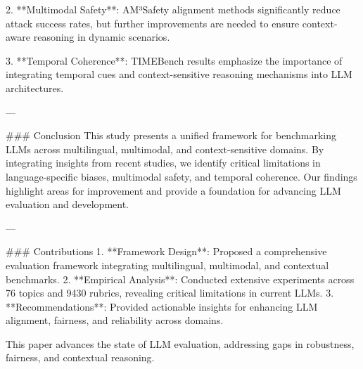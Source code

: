 2. **Multimodal Safety**: AM³Safety alignment methods significantly reduce attack success rates, but further improvements are needed to ensure context-aware reasoning in dynamic scenarios.  

3. **Temporal Coherence**: TIMEBench results emphasize the importance of integrating temporal cues and context-sensitive reasoning mechanisms into LLM architectures.  

---

### Conclusion  
This study presents a unified framework for benchmarking LLMs across multilingual, multimodal, and context-sensitive domains. By integrating insights from recent studies, we identify critical limitations in language-specific biases, multimodal safety, and temporal coherence. Our findings highlight areas for improvement and provide a foundation for advancing LLM evaluation and development.

---

### Contributions  
1. **Framework Design**: Proposed a comprehensive evaluation framework integrating multilingual, multimodal, and contextual benchmarks.  
2. **Empirical Analysis**: Conducted extensive experiments across 76 topics and 9430 rubrics, revealing critical limitations in current LLMs.  
3. **Recommendations**: Provided actionable insights for enhancing LLM alignment, fairness, and reliability across domains.  

This paper advances the state of LLM evaluation, addressing gaps in robustness, fairness, and contextual reasoning.
